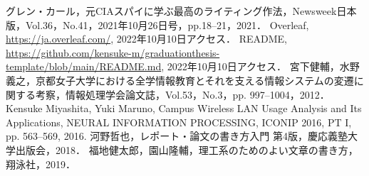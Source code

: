 \documentclass[a4paper,twocolumn,10pt]{ltjsarticle}
\begin{document}
\begin{thebibliography}{99}
  グレン・カール，元CIAスパイに学ぶ最高のライティング作法，Newsweek日本版，Vol.36，No.41，2021年10月26日号，pp.18--21，2021．
  Overleaf, \url{https://ja.overleaf.com/}, 2022年10月10日アクセス．
  README, \url{https://github.com/kensuke-m/graduationthesis-template/blob/main/README.md}, 2022年10月10日アクセス．
  宮下健輔，水野義之，京都女子大学における全学情報教育とそれを支える情報システムの変遷に関する考察，情報処理学会論文誌，Vol.53，No.3，pp. 997--1004，2012．
  Kensuke Miyashita, Yuki Maruno, Campus Wireless LAN Usage Analysis and Its Applications, NEURAL INFORMATION PROCESSING, ICONIP 2016, PT I, pp. 563--569, 2016.
  河野哲也，レポート・論文の書き方入門 第4版，慶応義塾大学出版会，2018．
  福地健太郎，園山隆輔，理工系のためのよい文章の書き方，翔泳社，2019．
\end{thebibliography}
\end{document}
